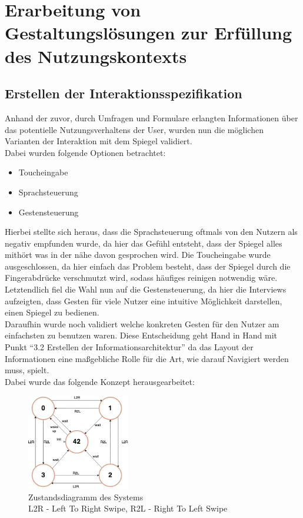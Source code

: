 \documentclass[12pt, a4paper]{scrartcl}
\begin{document}
	\newpage
	
	\section{Erarbeitung von Gestaltungslösungen zur Erfüllung des Nutzungskontexts}
	\subsection{Erstellen der Interaktionsspezifikation}
	Anhand der zuvor, durch Umfragen und Formulare erlangten Informationen über das potentielle Nutzungsverhaltens der User, wurden nun die möglichen Varianten der Interaktion mit dem Spiegel validiert.\\
	Dabei wurden folgende Optionen betrachtet:
	\begin{itemize}
		\setlength\itemsep{-0.5em}
		\item Toucheingabe
		\item Sprachsteuerung
		\item Gestensteuerung
	\end{itemize}
	Hierbei stellte sich heraus, dass die Sprachsteuerung oftmals von den Nutzern als negativ empfunden wurde, da hier das Gefühl entsteht, dass der Spiegel alles mithört was in der nähe davon gesprochen wird. Die Toucheingabe wurde ausgeschlossen, da hier einfach das Problem besteht, dass der Spiegel durch die Fingerabdrücke verschmutzt wird, sodass häufiges reinigen notwendig wäre.\\
	Letztendlich fiel die Wahl nun auf die Gestensteuerung, da hier die Interviews aufzeigten, dass Gesten für viele Nutzer eine intuitive Möglichkeit darstellen, einen Spiegel zu bedienen.\\
	Daraufhin wurde noch validiert welche konkreten Gesten für den Nutzer am einfachsten zu benutzen waren. Diese Entscheidung geht Hand in Hand mit Punkt “3.2 Erstellen der Informationsarchitektur” da das Layout der Informationen eine maßgebliche Rolle für die Art, wie darauf Navigiert werden muss, spielt.\\
	Dabei wurde das folgende Konzept herausgearbeitet:
	\begin{figure}[h!] 
		\centering
		\includegraphics[width=0.4\textwidth]{img/Zustandsdiagramm.png}
		\captionsetup{labelformat=empty}
		\caption{Zustandsdiagramm des Systems\\
		L2R - Left To Right Swipe, R2L - Right To Left Swipe}
	\end{figure}\\
\end{document}
